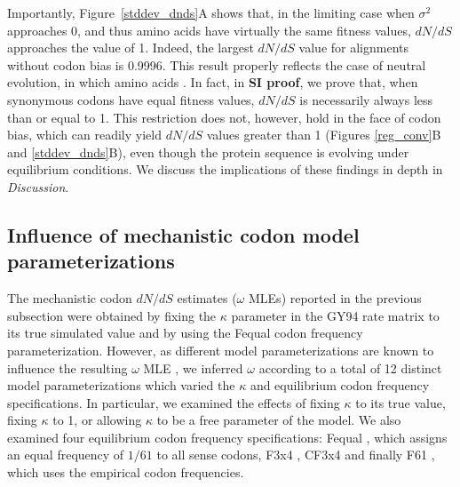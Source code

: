 \documentclass[11pt]{article}
\begin{document}
Importantly, Figure~\ref{stddev_dnds}A shows that, in the limiting case when $\sigma^2$ approaches 0, and thus amino acids have virtually the same fitness values, $dN/dS$ approaches the value of 1. Indeed, the largest $dN/dS$ value for alignments without codon bias is 0.9996. This result properly reflects the case of neutral evolution, in which amino acids . In fact, in \textbf{SI proof}, we prove that, when synonymous codons have equal fitness values, $dN/dS$ is necessarily always less than or equal to 1. This restriction does not, however, hold in the face of codon bias, which can readily yield $dN/dS$ values greater than 1 (Figures \ref{reg_conv}B and \ref{stddev_dnds}B), even though the protein sequence is evolving under equilibrium conditions. We discuss the implications of these findings in depth in \textit{Discussion}.


 \subsection*{Influence of mechanistic codon model parameterizations}

The mechanistic codon $dN/dS$ estimates ($\omega$ MLEs) reported in the previous subsection were obtained by fixing the $\kappa$ parameter in the GY94 rate matrix to its true simulated value and by using the Fequal codon frequency parameterization. However, as different model parameterizations are known to influence the resulting $\omega$ MLE \cite{YN00,Yang2006,ZhangYu2006}, we inferred $\omega$ according to a total of 12 distinct model parameterizations which varied the $\kappa$ and equilibrium codon frequency specifications. In particular, we examined the effects of fixing $\kappa$ to its true value, fixing $\kappa$ to 1, or allowing $\kappa$ to be a free parameter of the model. We also examined four equilibrium codon frequency specifications: Fequal \cite{YN00, Yang2006}, which assigns an equal frequency of $1/61$ to all sense codons, F3x4 \cite{MuseGaut1994}, CF3x4 \cite{Pond2010} and finally F61 \cite{GoldmanYang1994, YN00, YAng2006}, which uses the empirical codon frequencies.
\end{document}
